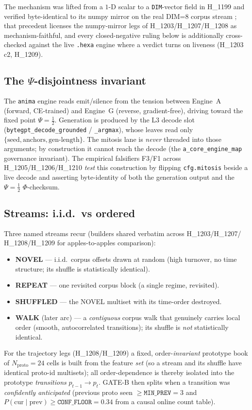 \documentclass[11pt,a4paper]{article}
\newcommand{\Psihalf}{\Psi=\tfrac12}
\begin{document}
The mechanism was lifted from a $1$-D scalar to a \verb|DIM|-vector field in
H\_1199 and verified byte-identical to its numpy mirror on the real DIM=8
corpus stream \citep{anima_H1199}; that precedent licenses the numpy-mirror legs
of H\_1203/H\_1207/H\_1208 as mechanism-faithful, and every closed-negative
ruling below is additionally cross-checked against the live \texttt{.hexa}
engine where a verdict turns on liveness (H\_1203 c2, H\_1209).

\subsection{The $\Psi$-disjointness invariant}

The \texttt{anima} engine reads emit/silence from the tension between Engine~A
(forward, CE-trained) and Engine~G (reverse, gradient-free), driving toward the
fixed point $\Psihalf$. Generation is produced by the L3 decode slot
(\verb|bytegpt_decode_grounded| / \verb|_argmax|), whose leaves read only
$\{\text{seed},\text{anchors},\text{gen-length}\}$. The mitosis lane is
\emph{never} threaded into those arguments; by construction it cannot reach the
decode (the \verb|a_core_engine_map| governance invariant). The empirical
falsifiers F3/F1 across H\_1205/H\_1206/H\_1210 \emph{test} this construction by
flipping \verb|cfg.mitosis| beside a live decode and asserting byte-identity of
both the generation output and the $\Psihalf$ $\Phi$-checksum.

\subsection{Streams: i.i.d.\ vs ordered}

Three named streams recur (builders shared verbatim across H\_1203/H\_1207/
H\_1208/H\_1209 for apples-to-apples comparison):
\begin{itemize}\itemsep0.2em
\item \textbf{NOVEL} --- i.i.d.\ corpus offsets drawn at random (high turnover,
      no time structure; its shuffle is statistically identical).
\item \textbf{REPEAT} --- one revisited corpus block (a single regime, revisited).
\item \textbf{SHUFFLED} --- the NOVEL multiset with its time-order destroyed.
\item \textbf{WALK} (later arc) --- a \emph{contiguous} corpus walk that
      genuinely carries local order (smooth, autocorrelated transitions); its
      shuffle is \emph{not} statistically identical.
\end{itemize}
For the trajectory legs (H\_1208/H\_1209) a fixed, order-\emph{invariant}
prototype book of $N_{\text{proto}}=24$ cells is built from the feature
\emph{set} (so a stream and its shuffle have identical proto-id multisets); all
order-dependence is thereby isolated into the prototype \emph{transitions}
$p_{t-1}\!\to\!p_t$. GATE-B then splits when a transition was \emph{confidently
anticipated} (previous proto seen $\ge \texttt{MIN\_PREV}=3$ and
$P(\text{cur}\mid\text{prev}) \ge \texttt{CONF\_FLOOR}=0.34$ from a causal online
count table).
\end{document}
